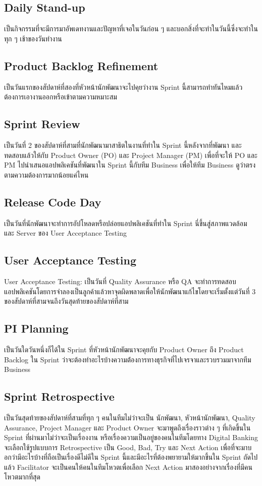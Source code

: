     \subsection{Daily Stand-up}
    เป็นกิจกรรมที่จะมีการมาอัพเดทงานและปัญหาที่เจอในวันก่อน ๆ และบอกสิ่งที่จะทำในวันนี้ซึ่งจะทำในทุก ๆ เช้าของวันทำงาน

    \subsection{Product Backlog Refinement}
    เป็นวันแรกของสัปดาห์ที่สองที่หัวหน้านักพัฒนาจะไปคุยว่างาน Sprint นี้สามารถทำทันไหมแล้วต้องการเอางานออกหรือเข้าตามความหมาะสม

    \subsection{Sprint Review}
    เป็นวันที่ 2 ของสัปดาห์ที่สามที่นักพัฒนามาสาธิตในงานที่ทำใน Sprint นี้หลังจากที่พัฒนา และทดสอบแล้วให้กับ Product Owner (PO) และ Project Manager (PM) เพื่อที่จะให้ PO และ PM ไปนำเสนอแอปพลิเคชันที่พัฒนาใน Sprint นี้กับทีม Business เพื่อให้ทีม Business ดูว่าตรงตามความต้องการมากน้อยแค่ไหน
    
    \subsection{Release Code Day}
    เป็นวันที่นักพัฒนาจะทำการอัปโหลดหรือปล่อยแอปพลิเคชันที่ทำใน Sprint นี่ขึ้นสู่สภาพแวดล้อม และ Server ของ User Acceptance Testing
    
    \subsection{User Acceptance Testing}
    User Acceptance Testing: เป็นวันที่ Quality Assurance หรือ QA จะทำการทดสอบแอปพลิเคชันโดยการจำลองเป็นลูกค้าแล้วหาจุดผิดพลาดเพื่อให้นักพัฒนาแก้ไขโดยจะเริ่มตั้งแต่วันที่ 3 ของสัปดาห์ที่สามจนถึงวันสุดท้ายของสัปดาห์ที่สาม

    \subsection{PI Planning}
    เป็นวันใดวันหนึ่งก็ได้ใน Sprint ที่หัวหน้านักพัฒนาจะคุยกับ Product Owner ถึง Product Backlog ใน Sprint ว่าจะต้องทำอะไรบ้างความต่้องการทางธุรกิจที่ไปเจรจาและรวบรวมมาจากทีม Business
            
    \subsection{Sprint Retrospective}
    เป็นวันสุดท้ายของสัปดาห์ที่สามที่ทุก ๆ คนในทีมไม่ว่าจะเป็น นักพัฒนา, หัวหน้านักพัฒนา, Quality Assurance, Project Manager และ Product Owner จะมาพูดถึงเรื่องราวต่าง ๆ ที่เกิดขึ้นใน Sprint ที่ผ่านมาไม่ว่าจะเป็นเรื่องงาน หรือเรื่องความเป็นอยู่ของคนในทีมโดยทาง Digital Banking จะเลือกใช้รูปแบบการ Retrospective เป็น Good, Bad, Try และ Next Action เพื่อที่จะมาบอกว่ามีอะไรบ้างที่ถือเป็นเรื่องดีไม่ดีใน Sprint นี้และมีอะไรที่ต้องพยายามให้มากขึ้นใน Sprint ถัดไปแล้ว Facilitator จะเป็นคนให้คนในทีมโหวตเพื่อเลือก Next Action มาสองอย่างจากเรื่องที่มีคนโหวตมากที่สุด

